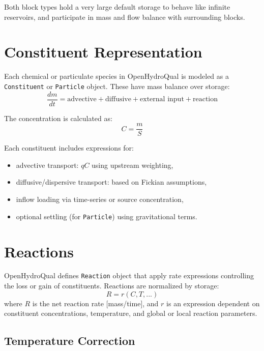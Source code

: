 \documentclass[12pt]{report}
\begin{document}
Both block types hold a very large default storage to behave like infinite reservoirs, and participate in mass and flow balance with surrounding blocks.

\section{Constituent Representation}

Each chemical or particulate species in OpenHydroQual is modeled as a \texttt{Constituent} or \texttt{Particle} object. These have mass balance over storage:
\begin{equation}
\frac{d m}{d t} = \text{advective} + \text{diffusive} + \text{external input} + \text{reaction}
\end{equation}

The concentration is calculated as:
\begin{equation}
C = \frac{m}{S}
\end{equation}

Each constituent includes expressions for:
\begin{itemize}
  \item advective transport: $q C$ using upstream weighting,
  \item diffusive/dispersive transport: based on Fickian assumptions,
  \item inflow loading via time-series or source concentration,
  \item optional settling (for \texttt{Particle}) using gravitational terms.
\end{itemize}

\section{Reactions}

OpenHydroQual defines \texttt{Reaction} object that apply rate expressions controlling the loss or gain of constituents. Reactions are normalized by storage:
\begin{equation}
R = r(C, T, ...)
\end{equation}
where $R$ is the net reaction rate [mass/time], and $r$ is an expression dependent on constituent concentrations, temperature, and global or local reaction parameters.

\subsection{Temperature Correction}
\end{document}

